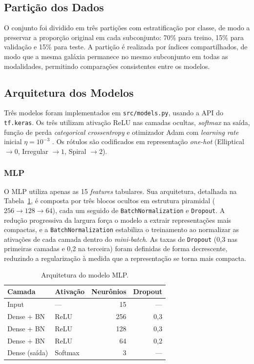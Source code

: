 \documentclass[12pt, a4paper]{article}
\begin{document}
\subsection{Partição dos Dados}

O conjunto foi dividido em três partições com estratificação por classe, de
modo a preservar a proporção original em cada subconjunto: 70\% para
treino, 15\% para validação e 15\% para teste. A partição é realizada por
índices compartilhados, de modo que a mesma galáxia permanece no mesmo
subconjunto em todas as modalidades, permitindo comparações consistentes
entre os modelos.

\subsection{Arquitetura dos Modelos}

Três modelos foram implementados em \texttt{src/models.py}, usando a API
do \texttt{tf.keras}. Os três utilizam ativação ReLU nas camadas ocultas,
\textit{softmax} na saída, função de perda \textit{categorical
crossentropy} e otimizador Adam com \textit{learning rate} inicial
$\eta = 10^{-3}$ \cite{kingma2014}. Os rótulos são codificados em
representação \textit{one-hot} (Elliptical $\to 0$, Irregular $\to 1$,
Spiral $\to 2$).

\subsubsection{MLP}

O MLP utiliza apenas as 15 \textit{features} tabulares. Sua arquitetura,
detalhada na Tabela~\ref{tab:mlp_arch}, é composta por três blocos ocultos
em estrutura piramidal ($256 \to 128 \to 64$), cada um seguido de
\texttt{BatchNormalization} e \texttt{Dropout}. A redução progressiva da
largura força o modelo a extrair representações mais compactas, e a
\texttt{BatchNormalization} estabiliza o treinamento ao normalizar as
ativações de cada camada dentro do \textit{mini-batch}. As taxas de
\texttt{Dropout} (0,3 nas primeiras camadas e 0,2 na terceira) foram
definidas de forma decrescente, reduzindo a regularização à medida que a
representação se torna mais compacta.

\begin{table}[H]
  \centering
  \caption{Arquitetura do modelo MLP.}
  \label{tab:mlp_arch}
  \begin{tabular}{llrr}
    \toprule
    \textbf{Camada} & \textbf{Ativação} & \textbf{Neurônios} & \textbf{Dropout} \\
    \midrule
    Input           & ---       & 15  & --- \\
    Dense + BN      & ReLU      & 256 & 0,3 \\
    Dense + BN      & ReLU      & 128 & 0,3 \\
    Dense + BN      & ReLU      & 64  & 0,2 \\
    Dense (saída)   & Softmax   & 3   & --- \\
    \bottomrule
  \end{tabular}
\end{table}
\end{document}

